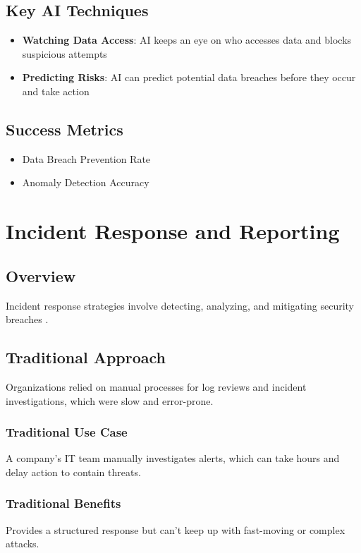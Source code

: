 \documentclass[10pt,a4paper]{article}
\begin{document}
\subsection{Key AI Techniques}
\begin{itemize}\itemsep0.5em
    \item \textbf{Watching Data Access}: AI keeps an eye on who accesses data and blocks suspicious attempts
    \item \textbf{Predicting Risks}: AI can predict potential data breaches before they occur and take action
\end{itemize}

\subsection{Success Metrics}
\begin{itemize}\itemsep0.5em
    \item Data Breach Prevention Rate
    \item Anomaly Detection Accuracy
\end{itemize}

\section{Incident Response and Reporting}
\subsection{Overview}
Incident response strategies involve detecting, analyzing, and mitigating security breaches \cite{sarker2024}.

\subsection{Traditional Approach}
Organizations relied on manual processes for log reviews and incident investigations, which were slow and error-prone.

\subsubsection{Traditional Use Case}
A company's IT team manually investigates alerts, which can take hours and delay action to contain threats.

\subsubsection{Traditional Benefits}
Provides a structured response but can't keep up with fast-moving or complex attacks.
\end{document}
